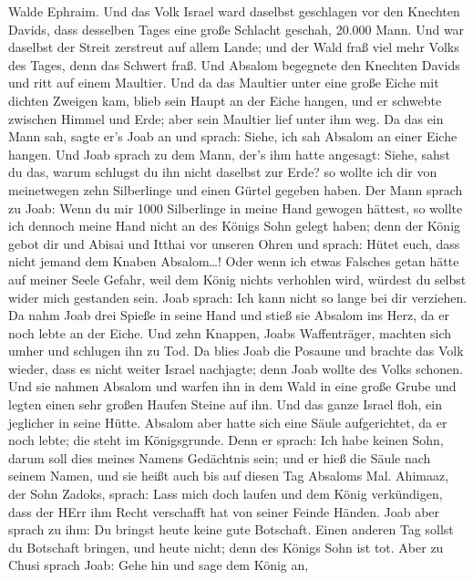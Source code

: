 Walde Ephraim.  Und das Volk Israel ward daselbst geschlagen
vor den Knechten Davids, dass desselben Tages eine große Schlacht
geschah, 20.000 Mann.  Und war daselbst der Streit zerstreut
auf allem Lande; und der Wald fraß viel mehr Volks des Tages, denn das
Schwert fraß.  Und Absalom begegnete den Knechten Davids und
ritt auf einem Maultier. Und da das Maultier unter eine große Eiche mit
dichten Zweigen kam, blieb sein Haupt an der Eiche hangen, und er
schwebte zwischen Himmel und Erde; aber sein Maultier lief unter ihm
weg.  Da das ein Mann sah, sagte er's Joab an und sprach:
Siehe, ich sah Absalom an einer Eiche hangen.  Und Joab
sprach zu dem Mann, der's ihm hatte angesagt: Siehe, sahst du das, warum
schlugst du ihn nicht daselbst zur Erde? so wollte ich dir von
meinetwegen zehn Silberlinge und einen Gürtel gegeben haben.
 Der Mann sprach zu Joab: Wenn du mir 1000 Silberlinge in
meine Hand gewogen hättest, so wollte ich dennoch meine Hand nicht an
des Königs Sohn gelegt haben; denn der König gebot dir und Abisai und
Itthai vor unseren Ohren und sprach: Hütet euch, dass nicht jemand dem
Knaben Absalom\ldots!  Oder wenn ich etwas Falsches getan
hätte auf meiner Seele Gefahr, weil dem König nichts verhohlen wird,
würdest du selbst wider mich gestanden sein.  Joab sprach:
Ich kann nicht so lange bei dir verziehen. Da nahm Joab drei Spieße in
seine Hand und stieß sie Absalom ins Herz, da er noch lebte an der
Eiche.  Und zehn Knappen, Joabs Waffenträger, machten sich
umher und schlugen ihn zu Tod.  Da blies Joab die Posaune
und brachte das Volk wieder, dass es nicht weiter Israel nachjagte; denn
Joab wollte des Volks schonen.  Und sie nahmen Absalom und
warfen ihn in dem Wald in eine große Grube und legten einen sehr großen
Haufen Steine auf ihn. Und das ganze Israel floh, ein jeglicher in seine
Hütte.  Absalom aber hatte sich eine Säule aufgerichtet, da
er noch lebte; die steht im Königsgrunde. Denn er sprach: Ich habe
keinen Sohn, darum soll dies meines Namens Gedächtnis sein; und er hieß
die Säule nach seinem Namen, und sie heißt auch bis auf diesen Tag
Absaloms Mal.  Ahimaaz, der Sohn Zadoks, sprach: Lass mich
doch laufen und dem König verkündigen, dass der HErr ihm Recht
verschafft hat von seiner Feinde Händen.  Joab aber sprach
zu ihm: Du bringst heute keine gute Botschaft. Einen anderen Tag sollst
du Botschaft bringen, und heute nicht; denn des Königs Sohn ist tot.
 Aber zu Chusi sprach Joab: Gehe hin und sage dem König an,
